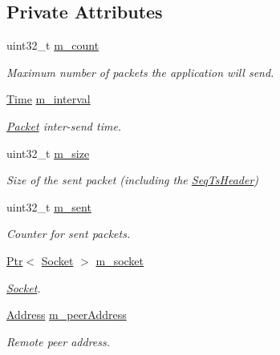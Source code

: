 \subsection*{Private Attributes}
\begin{DoxyCompactItemize}
\item 
uint32\+\_\+t \hyperlink{classns3_1_1UdpClient_aa42e5fec49376e6a5de8a8d6fecb3654}{m\+\_\+count}
\begin{DoxyCompactList}\small\item\em Maximum number of packets the application will send. \end{DoxyCompactList}\item 
\hyperlink{classns3_1_1Time}{Time} \hyperlink{classns3_1_1UdpClient_a10be8f529aed10334cfb1239b231b7a0}{m\+\_\+interval}
\begin{DoxyCompactList}\small\item\em \hyperlink{classns3_1_1Packet}{Packet} inter-\/send time. \end{DoxyCompactList}\item 
uint32\+\_\+t \hyperlink{classns3_1_1UdpClient_aa3adbd7e4fc1590d0b99c225a083abb9}{m\+\_\+size}
\begin{DoxyCompactList}\small\item\em Size of the sent packet (including the \hyperlink{classns3_1_1SeqTsHeader}{Seq\+Ts\+Header}) \end{DoxyCompactList}\item 
uint32\+\_\+t \hyperlink{classns3_1_1UdpClient_a3bec0cbaaf2ed40d429d1c0110fa7681}{m\+\_\+sent}
\begin{DoxyCompactList}\small\item\em Counter for sent packets. \end{DoxyCompactList}\item 
\hyperlink{classns3_1_1Ptr}{Ptr}$<$ \hyperlink{classns3_1_1Socket}{Socket} $>$ \hyperlink{classns3_1_1UdpClient_a3cdc972a2847e5f79738e1880e96bb0b}{m\+\_\+socket}
\begin{DoxyCompactList}\small\item\em \hyperlink{classns3_1_1Socket}{Socket}. \end{DoxyCompactList}\item 
\hyperlink{classns3_1_1Address}{Address} \hyperlink{classns3_1_1UdpClient_abda566e33a7381c7ce53e7f9aae39013}{m\+\_\+peer\+Address}
\begin{DoxyCompactList}\small\item\em Remote peer address. \end{DoxyCompactList}\item 

\end{DoxyCompactItemize}
